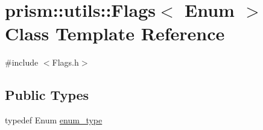 \hypertarget{classprism_1_1utils_1_1_flags}{}\section{prism\+:\+:utils\+:\+:Flags$<$ Enum $>$ Class Template Reference}
\label{classprism_1_1utils_1_1_flags}


{\ttfamily \#include $<$Flags.\+h$>$}

\subsection*{Public Types}
\begin{DoxyCompactItemize}
\item 
typedef Enum \hyperlink{classprism_1_1utils_1_1_flags_a516bc733417fe76000ad526e1fc525e6}{enum\+\_\+type}
\end{DoxyCompactItemize}
